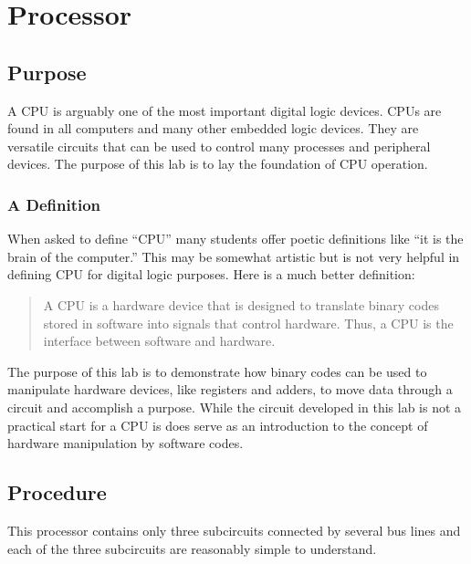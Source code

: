 \chapter{Processor}\label{proc}

\section{Purpose}

A \acf{CPU} is arguably one of the most important digital logic devices. \acp{CPU} are found in all computers and many other embedded logic devices. They are versatile circuits that can be used to control many processes and peripheral devices. The purpose of this lab is to lay the foundation of \ac{CPU} operation.

\subsection{A Definition} 

When asked to define ``\ac{CPU}'' many students offer poetic definitions like ``it is the brain of the computer.'' This may be somewhat artistic but is not very helpful in defining \ac{CPU} for digital logic purposes. Here is a much better definition:

\begin{quote}
	A \acf{CPU} is a hardware device that is designed to translate binary codes stored in software into signals that control hardware. Thus, a \ac{CPU} is the interface between software and hardware.
\end{quote}

The purpose of this lab is to demonstrate how binary codes can be used to manipulate hardware devices, like registers and adders, to move data through a circuit and accomplish a purpose. While the circuit developed in this lab is not a practical start for a \ac{CPU} is does serve as an introduction to the concept of hardware manipulation by software codes. 

\section{Procedure}

This processor contains only three subcircuits connected by several bus lines and each of the three subcircuits are reasonably simple to understand.

